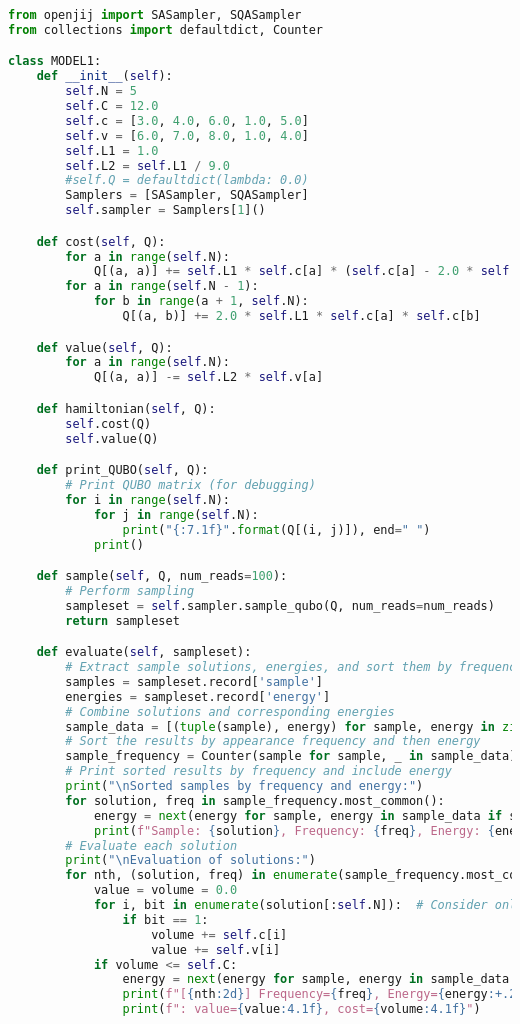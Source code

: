 \documentclass[uplatex,dvipdfmx,a4paper,11pt,oneside,openany]{jsbook}
\begin{document}
\begin{lstlisting}[language=Python]
from openjij import SASampler, SQASampler
from collections import defaultdict, Counter

class MODEL1:
    def __init__(self):
        self.N = 5
        self.C = 12.0
        self.c = [3.0, 4.0, 6.0, 1.0, 5.0]
        self.v = [6.0, 7.0, 8.0, 1.0, 4.0]
        self.L1 = 1.0
        self.L2 = self.L1 / 9.0
        #self.Q = defaultdict(lambda: 0.0)
        Samplers = [SASampler, SQASampler]
        self.sampler = Samplers[1]()

    def cost(self, Q):
        for a in range(self.N):
            Q[(a, a)] += self.L1 * self.c[a] * (self.c[a] - 2.0 * self.C)
        for a in range(self.N - 1):
            for b in range(a + 1, self.N):
                Q[(a, b)] += 2.0 * self.L1 * self.c[a] * self.c[b]

    def value(self, Q):
        for a in range(self.N):
            Q[(a, a)] -= self.L2 * self.v[a]

    def hamiltonian(self, Q):
        self.cost(Q)
        self.value(Q)

    def print_QUBO(self, Q):
        # Print QUBO matrix (for debugging)
        for i in range(self.N):
            for j in range(self.N):
                print("{:7.1f}".format(Q[(i, j)]), end=" ")
            print()

    def sample(self, Q, num_reads=100):
        # Perform sampling
        sampleset = self.sampler.sample_qubo(Q, num_reads=num_reads)
        return sampleset

    def evaluate(self, sampleset):
        # Extract sample solutions, energies, and sort them by frequency
        samples = sampleset.record['sample']
        energies = sampleset.record['energy']
        # Combine solutions and corresponding energies
        sample_data = [(tuple(sample), energy) for sample, energy in zip(samples, energies)]
        # Sort the results by appearance frequency and then energy
        sample_frequency = Counter(sample for sample, _ in sample_data)
        # Print sorted results by frequency and include energy
        print("\nSorted samples by frequency and energy:")
        for solution, freq in sample_frequency.most_common():
            energy = next(energy for sample, energy in sample_data if sample == solution)
            print(f"Sample: {solution}, Frequency: {freq}, Energy: {energy:+.2f}")
        # Evaluate each solution
        print("\nEvaluation of solutions:")
        for nth, (solution, freq) in enumerate(sample_frequency.most_common(), 1):
            value = volume = 0.0
            for i, bit in enumerate(solution[:self.N]):  # Consider only the first N bits for w and c
                if bit == 1:
                    volume += self.c[i]
                    value += self.v[i]
            if volume <= self.C:
                energy = next(energy for sample, energy in sample_data if sample == solution)
                print(f"[{nth:2d}] Frequency={freq}, Energy={energy:+.2f},\n Solution={solution}", end="\t")
                print(f": value={value:4.1f}, cost={volume:4.1f}")


\end{lstlisting}
\end{document}

